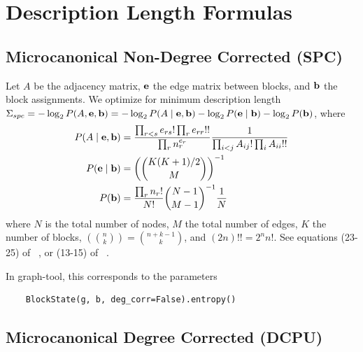 \documentclass[aps,pre,superscriptaddress]{article}
\begin{document}
\section{Description Length Formulas}
\label{sbm-formulas}

\subsection{Microcanonical Non-Degree Corrected (SPC)}

Let $A$ be the adjacency matrix, $\vb{e}$ the edge matrix between blocks, and $\vb{b}$ the block assignments.
We optimize for minimum description length $\Sigma_{spc} = -\log_2P(A, \vb{e}, \vb{b}) = -\log_2 P(A \mid \vb{e}, \vb{b}) - \log_2 P(\vb{e} \mid \vb{b}) - \log_2 P(\vb{b})$, where
\begin{align}
	P(A \mid \vb{e}, \vb{b}) & = \frac{\prod_{r < s} e_{rs}! \prod_{r} e_{rr}!!}{\prod_r n_r^{e_r}} \frac{1}{\prod_{i < j} A_{ij}! \prod_{i} A_{ii}!!} \\
	P(\vb{e} \mid \vb{b})    & = \left( \binom{K(K+1)/2}{M} \right)^{-1}                                                                               \\
	P(\vb{b})                & = \frac{\prod_r n_r!}{N!} \binom{N - 1}{M - 1}^{-1} \frac{1}{N}
\end{align}
where $N$ is the total number of nodes, $M$ the total number of edges, $K$ the number of blocks, $\left( \binom{n}{k} \right) = \binom{n + k - 1}{k}$, and $(2n)!! = 2^n n!$.
See equations (23-25) of ~\cite{peixoto17-01}, or (13-15) of ~\cite{funke19-04}.

In graph-tool, this corresponds to the parameters
\begin{verbatim}
    BlockState(g, b, deg_corr=False).entropy()
\end{verbatim}

\subsection{Microcanonical Degree Corrected (DCPU)}
\end{document}
